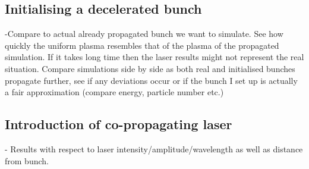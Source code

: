 \subsection{Initialising a decelerated bunch}
-Compare to actual already propagated bunch we want to simulate. See how quickly the uniform plasma resembles that of the plasma of the propagated simulation. If it takes long time then the laser results might not represent the real situation.  Compare simulations side by side as both real and initialised bunches propagate further, see if any deviations occur or if the bunch I set up is actually a fair approximation (compare energy, particle number etc.)
\subsection{Introduction of co-propagating laser}
- Results with respect to laser intensity/amplitude/wavelength as well as distance from bunch.